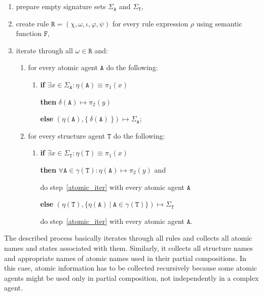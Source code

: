 \documentclass[12pt]{fithesis2}
\begin{document}
\begin{enumerate}
\item prepare empty signature sets $\Sigma_\mathtt{A}$ and $\Sigma_\mathtt{T}$, 
\item create rule $\mathtt{R} = (\chi, \omega, \iota, \varphi, \psi)$ for every rule expression $\rho$ using semantic function $\mathtt{F}$,
\item iterate through all $\omega \in \mathtt{R}$ and:
\begin{enumerate}
  \item \label{atomic_iter} for every atomic agent $\mathtt{A}$ do the following:
  	\begin{enumerate}
  		\item \textbf{if} $\exists x \in \Sigma_\mathtt{A}: \eta(\mathtt{A}) \equiv \pi_1(x) $ 

  		\textbf{then} $\delta(\mathtt{A}) \mapsto \pi_2(y)$

  		\textbf{else} $(\eta(\mathtt{A}), \{~\delta(\mathtt{A})~\}) \mapsto \Sigma_\mathtt{A}$;
	\end{enumerate}
  \item \label{structure_iter} for every structure agent $\mathtt{T}$ do the following:
	\begin{enumerate}
	  \item \textbf{if} $\exists x \in \Sigma_\mathtt{T}: \eta(\mathtt{T}) \equiv \pi_1(x) $

	  \textbf{then} $\forall \mathtt{A} \in \gamma(\mathtt{T}): \eta(\mathtt{A}) \mapsto \pi_2(y)$ and 

	  \hspace*{1cm} do step~\ref{atomic_iter} with every atomic agent $\mathtt{A}$

	  \textbf{else} $(\eta(\mathtt{T}), \{ \eta(\mathtt{A}) ~|~ \mathtt{A} \in \gamma(\mathtt{T}) \}) \mapsto \Sigma_\mathtt{T}$ 

	  \hspace*{0.75cm} do step~\ref{atomic_iter} with every atomic agent $\mathtt{A}$.
	\end{enumerate}
\end{enumerate}
\end{enumerate}

The described process basically iterates through all rules and collects all atomic names and states associated with them. Similarly, it collects all structure names and appropriate names of atomic names used in their partial compositions. In this case, atomic information has to be collected recursively because some atomic agents might be used only in partial composition, not independently in a complex agent.
\end{document}
